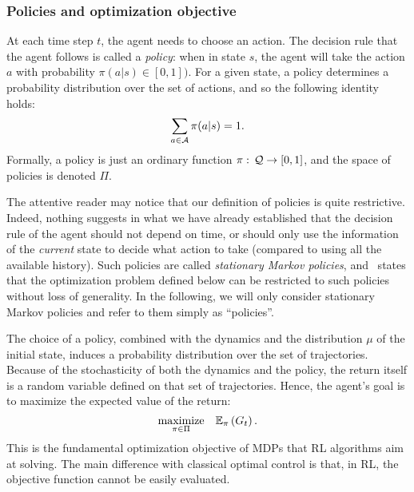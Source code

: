 		\subsubsection{Policies and optimization objective} 
			At each time step $t$, the agent needs to choose an action. The decision rule that the agent follows is called a\emph{ policy}: when in state $s$, the agent will take the action $a$ with probability $\pi(a|s)\in[0,1])$. For a given state, a policy determines a probability distribution over the set of actions, and so the following identity holds:
			\begin{equation*}
			\sum_{a\in\mathcal{A}}\pi(a|s) = 1.
			\end{equation*} 
			Formally, a policy is just an ordinary function $\pi:\,\mathcal{Q}\to[0,1]$, and the space of policies is denoted $\Pi$.\par
			The attentive reader may notice that our definition of policies is quite restrictive. Indeed, nothing suggests in what we have already established that the decision rule of the agent should not depend on time, or should only use the information of the\emph{ current} state to decide what action to take (compared to using all the available history). Such policies are called\emph{ stationary Markov policies}, and~\cite[Theorem\,2.1]{altman1999constrained} states that the optimization problem defined below can be restricted to such policies without loss of generality. In the following, we will only consider stationary Markov policies and refer to them simply as \enquote{policies}.\par
			The choice of a policy, combined with the dynamics and the distribution $\mu$ of the initial state, induces a probability distribution over the set of trajectories. Because of the stochasticity of both the dynamics and the policy, the return itself is a random variable defined on that set of trajectories. Hence, the agent's goal is to maximize the expected value of the return:
			\begin{equation}
					\underset{\pi\in\Pi}{\text{maximize}}\quad\mathbb{E}_\pi\left(G_t\right). \label{eq:mdp problem}
			\end{equation}
			This is the fundamental optimization objective of MDPs that RL algorithms aim at solving. The main difference with classical optimal control is that, in RL, the objective function cannot be easily evaluated.
